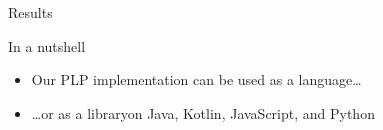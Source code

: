 \documentclass[presentation]{beamer}\mode<presentation>{\usetheme{AMSBolognaFC}}
\begin{document}
\begin{frame}[c, allowframebreaks]{Results}

    \begin{block}{In a nutshell}
        \begin{itemize}
            \item Our PLP implementation can be used \alert{as a language}\footnotemark\ldots


            \item \ldots or as a library\footnotemark on Java, Kotlin, JavaScript, and Python

        \end{itemize}
    \end{block}


\end{frame}
\end{document}
